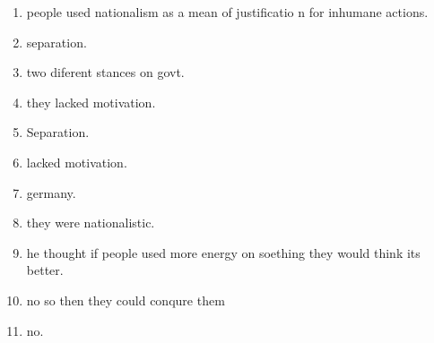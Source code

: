 
	\begin{enumerate}
		\item people used nationalism as a mean of justificatio n for inhumane actions.
		\item separation.
		\item two diferent stances on govt.
		\item they lacked motivation.
		\item Separation.
		\item lacked motivation.
		\item germany.
		\item they were nationalistic.
		\item he thought if people used more energy on soething they would think its better.
		\item no so then they could conqure them
		\item no.
	\end{enumerate}


